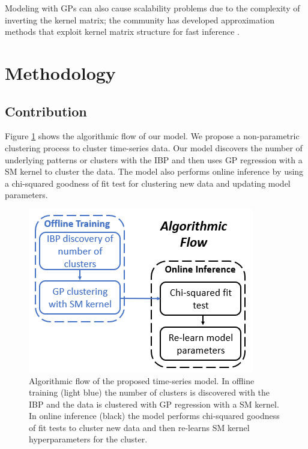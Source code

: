\documentclass{article}
\begin{document}
Modeling with GPs can also cause scalability problems due to the complexity of inverting the kernel matrix; the community has developed approximation methods that exploit kernel matrix structure for fast inference \cite{KISS-GP}.

\section{Methodology}

\subsection{Contribution}
Figure \ref{AlgFlow} shows the algorithmic flow of our model. We propose a non-parametric clustering process to cluster time-series data. Our model discovers the number of underlying patterns or clusters with the IBP and then uses GP regression with a SM kernel to cluster the data. The model also performs online inference by using a chi-squared goodness of fit test for clustering new data and updating model parameters.

\begin{figure}[ht]
\vskip 0.2in
\begin{center}
\centerline{\includegraphics[width=\columnwidth]{AlgFlow}}
\caption{Algorithmic flow of the proposed time-series model. In offline training (light blue) the number of clusters is discovered with the IBP and the data is clustered with GP regression with a SM kernel. In online inference (black) the model performs chi-squared goodness of fit tests to cluster new data and then re-learns SM kernel hyperparameters for the cluster.}
\label{AlgFlow}
\end{center}
\vskip -0.2in
\end{figure} 
\end{document}
